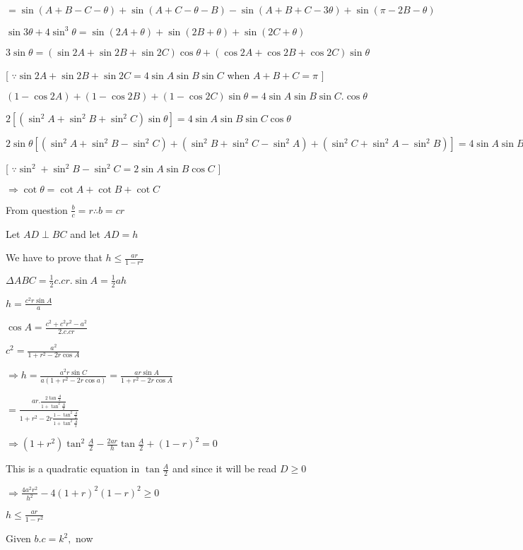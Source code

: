   $= \sin(A + B - C - \theta) + \sin(A + C - \theta - B) - \sin(A + B + C - 3\theta) + \sin(\pi - 2B - \theta)$

  $\sin 3\theta + 4\sin^3\theta = \sin(2A + \theta) + \sin(2B + \theta) + \sin(2C + \theta)$

  $3\sin\theta = (\sin2A + \sin2B + \sin2C)\cos\theta + (\cos2A + \cos2B + \cos2C)\sin\theta$

  [ $\because \sin2A + \sin2B + \sin 2C = 4\sin A\sin B\sin C$ when $A + B + C = \pi$ ]

  $(1 - \cos 2A) + (1 - \cos 2B) + (1 - \cos 2C)\sin\theta = 4\sin A\sin B\sin C.\cos\theta$

  $2[(\sin^2A + \sin^2B + \sin^2C)\sin\theta] = 4\sin A\sin B\sin C\cos\theta$

  $2\sin\theta[(\sin^2A + \sin^2B - \sin^2C) + (\sin^2B + \sin^2C - \sin^2A) + (\sin^2C + \sin^2A - \sin^2B)] = 4\sin A\sin
  B\sin C\cos\theta$

  [ $\because \sin^2 + \sin^2B - \sin^2C = 2\sin A\sin B\cos C$ ]

  $\Rightarrow \cot\theta = \cot A + \cot B + \cot C$

\item From question $\frac{b}{c} = r \therefore b = cr$

  Let $AD\perp BC$ and let $AD = h$

  We have to prove that $h\leq \frac{ar}{1 - r^2}$

  $\Delta ABC = \frac{1}{2}c.cr.\sin A = \frac{1}{2}ah$

  $h = \frac{c^2r\sin A}{a}$

  $\cos A = \frac{c^2 + c^2r^2 - a^2}{2.c.cr}$

  $c^2 = \frac{a^2}{1 + r^2 - 2r\cos A}$

  $\Rightarrow h = \frac{a^2r\sin C}{a(1 + r^2 - 2r\cos a)} = \frac{ar\sin A}{1 + r^2 - 2r\cos A}$

  $= \frac{ar.\frac{2\tan\frac{A}{2}}{1 + \tan^2\frac{A}{2}}}{1 + r^2 - 2r\frac{1 - \tan^2\frac{A}{2}}{1 +
      \tan^2\frac{A}{2}}}$

  $\Rightarrow (1 + r^2)\tan^2\frac{A}{2} -\frac{2ar}{h}\tan\frac{A}{2} + (1 - r)^2 = 0$

  This is a quadratic equation in $\tan\frac{A}{2}$ and since it will be read $D \geq 0$

  $\Rightarrow \frac{4a^2r^2}{h^2} - 4(1 + r)^2(1 - r)^2\geq 0$

  $h \leq \frac{ar}{1 - r^2}$

\item Given $b.c = k^2,$ now

